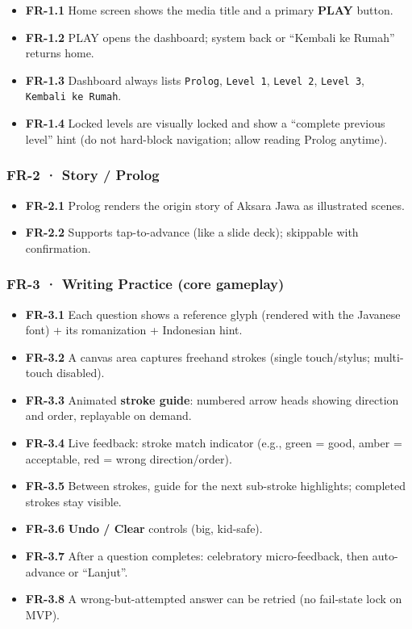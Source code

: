 \documentclass[
  11pt,
]{article}
\providecommand{\tightlist}{%
  \setlength{\itemsep}{0pt}\setlength{\parskip}{0pt}}
\begin{document}
\begin{itemize}
\tightlist
\item
  \textbf{FR-1.1} Home screen shows the media title and a primary
  \textbf{PLAY} button.
\item
  \textbf{FR-1.2} PLAY opens the dashboard; system back or ``Kembali ke
  Rumah'' returns home.
\item
  \textbf{FR-1.3} Dashboard always lists \texttt{Prolog},
  \texttt{Level\ 1}, \texttt{Level\ 2}, \texttt{Level\ 3},
  \texttt{Kembali\ ke\ Rumah}.
\item
  \textbf{FR-1.4} Locked levels are visually locked and show a
  ``complete previous level'' hint (do not hard-block navigation; allow
  reading Prolog anytime).
\end{itemize}

\subsubsection{FR-2 · Story / Prolog}\label{fr-2-story-prolog}

\begin{itemize}
\tightlist
\item
  \textbf{FR-2.1} Prolog renders the origin story of Aksara Jawa as
  illustrated scenes.
\item
  \textbf{FR-2.2} Supports tap-to-advance (like a slide deck); skippable
  with confirmation.
\end{itemize}

\subsubsection{FR-3 · Writing Practice (core
gameplay)}\label{fr-3-writing-practice-core-gameplay}

\begin{itemize}
\tightlist
\item
  \textbf{FR-3.1} Each question shows a reference glyph (rendered with
  the Javanese font) + its romanization + Indonesian hint.
\item
  \textbf{FR-3.2} A canvas area captures freehand strokes (single
  touch/stylus; multi-touch disabled).
\item
  \textbf{FR-3.3} Animated \textbf{stroke guide}: numbered arrow heads
  showing direction and order, replayable on demand.
\item
  \textbf{FR-3.4} Live feedback: stroke match indicator (e.g., green =
  good, amber = acceptable, red = wrong direction/order).
\item
  \textbf{FR-3.5} Between strokes, guide for the next sub-stroke
  highlights; completed strokes stay visible.
\item
  \textbf{FR-3.6} \textbf{Undo / Clear} controls (big, kid-safe).
\item
  \textbf{FR-3.7} After a question completes: celebratory
  micro-feedback, then auto-advance or ``Lanjut''.
\item
  \textbf{FR-3.8} A wrong-but-attempted answer can be retried (no
  fail-state lock on MVP).
\end{itemize}
\end{document}
